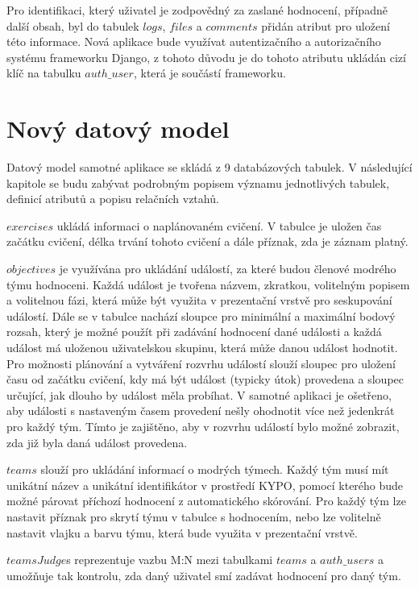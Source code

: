 \documentclass[
  digital, %
  twoside, %
  table,   %
  nolof,     %
  nolot,     %
]{fithesis3}
\begin{document}
Pro identifikaci, který uživatel je zodpovědný za zaslané hodnocení, případně další obsah, byl do tabulek $logs$, $files$ a $comments$ přidán atribut pro uložení této informace. Nová aplikace bude využívat autentizačního a autorizačního systému frameworku Django, z tohoto důvodu je do tohoto atributu ukládán cizí klíč na tabulku $auth\_user$, která je součástí frameworku.

\section{Nový datový model}

Datový model samotné aplikace se skládá z 9 databázových tabulek. V následující kapitole se budu zabývat podrobným popisem významu jednotlivých tabulek, definicí atributů a popisu relačních vztahů.

$exercises$ ukládá informaci o naplánovaném cvičení. V tabulce je uložen čas začátku cvičení, délka trvání tohoto cvičení a dále příznak, zda je záznam platný.

$objectives$ je využívána pro ukládání událostí, za které budou členové modrého týmu hodnoceni. Každá událost je tvořena názvem, zkratkou, volitelným popisem a volitelnou fázi, která může být využita v prezentační vrstvě pro seskupování událostí. Dále se v tabulce nachází sloupce pro minimální a maximální bodový rozsah, který je možné použít při zadávání hodnocení dané události a každá událost má uloženou uživatelskou skupinu, která může danou událost hodnotit. Pro možnosti plánování a vytváření rozvrhu událostí slouží sloupec pro uložení času od začátku cvičení, kdy má být událost (typicky útok) provedena a sloupec určující, jak dlouho by událost měla probíhat. V samotné aplikaci je ošetřeno, aby události s nastaveným časem provedení nešly ohodnotit více než jedenkrát pro každý tým. Tímto je zajištěno, aby v rozvrhu událostí bylo možné zobrazit, zda již byla daná událost provedena. 

$teams$ slouží pro ukládání informací o modrých týmech. Každý tým musí mít unikátní název a unikátní identifikátor v prostředí KYPO, pomocí kterého bude možné párovat příchozí hodnocení z automatického skórování. Pro každý tým lze nastavit příznak pro skrytí týmu v tabulce s hodnocením, nebo lze volitelně nastavit vlajku a barvu týmu, která bude využita v prezentační vrstvě.

$teamsJudge$s reprezentuje vazbu M:N mezi tabulkami $teams$ a $auth\_users$ a umožňuje tak kontrolu, zda daný uživatel smí zadávat hodnocení pro daný tým. 
\end{document}
